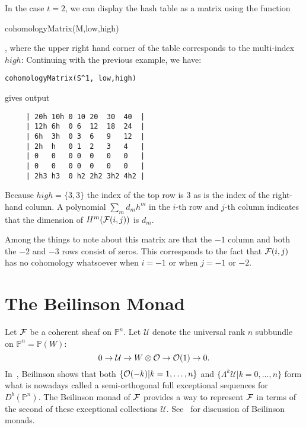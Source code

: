 \documentclass[twoside,12pt, leqno]{amsart}
\def\PP{{\mathbb P}}
\def\CU{{\mathcal U}}
\begin{document}
In the case $t=2$, we can display the hash table as a matrix using the function
\begin{verb}
 cohomologyMatrix(M,low,high)
\end{verb},
where the upper right hand corner of the table corresponds to the multi-index $high$: Continuing with the previous example,
we have:
{\small \begin{verbatim}
cohomologyMatrix(S^1, low,high)
\end{verbatim}
\noindent gives output
\begin{verbatim}
     | 20h 10h 0 10 20  30  40  |
     | 12h 6h  0 6  12  18  24  |
     | 6h  3h  0 3  6   9   12  |
     | 2h  h   0 1  2   3   4   |
     | 0   0   0 0  0   0   0   |
     | 0   0   0 0  0   0   0   |
     | 2h3 h3  0 h2 2h2 3h2 4h2 |
\end{verbatim}}
Because $high = \{3,3\}$ the index of the top row is 3 as is the index of the right-hand column. A polynomial $\sum_m d_mh^m$ in the $i$-th row and $j$-th column indicates that the dimension
of $H^m({\mathcal F}(i,j))$ is $d_m$. 

Among the things to note about this matrix are that the $-1$ column and both the $-2$ and $-3$ rows consist of  zeros. This corresponds to the fact that ${\mathcal F}(i,j)$ has no cohomology whatsoever when $i=-1$ or when $j=-1$ or $-2$.

    
\section{The Beilinson Monad}\label{sec:beilinson monad}
Let ${\mathcal F}$ be a coherent sheaf on $\PP^n$. 
Let $\CU$ denote the universal rank $n$ subbundle on $\PP^n=\PP(W)$:
$$ 0 \to \CU \to W\otimes \sO \to \sO(1) \to 0.$$ 
In~\cite{beilinson}, Beilinson shows that both $\{ {\mathcal O}(-k) | k=1,\ldots,n\}$ and 
$\{ \Lambda^k \CU | k=0, \ldots, n\}$ form what is nowadays called a semi-orthogonal full exceptional  sequences for $D^b(\PP^n)$.
The Beilinson monad of ${\mathcal F}$ provides a way to represent ${\mathcal F}$ in terms of the second of these exceptional collections $\CU$.  See~\cite{beilinson,AO,EFS,Huy} for discussion of Beilinson monads.
\end{document}
